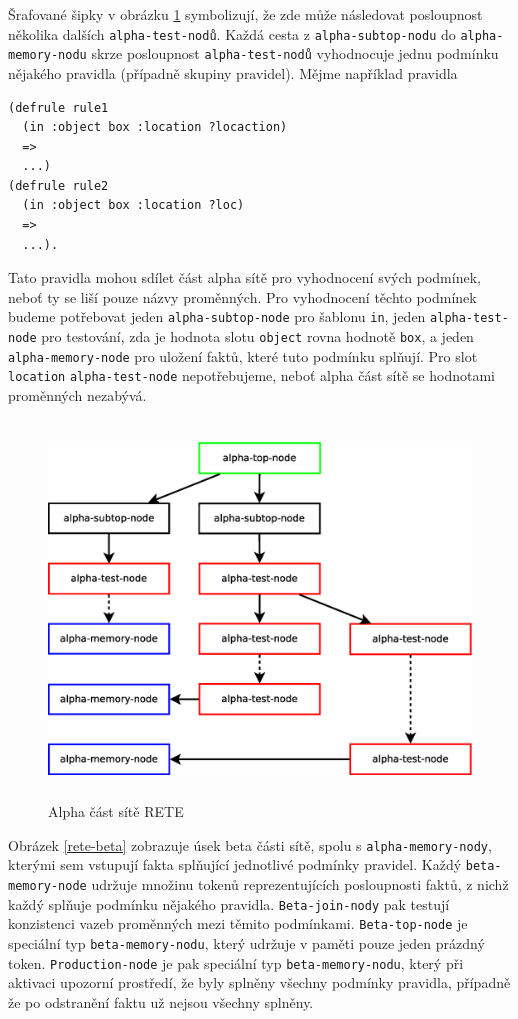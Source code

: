 Šrafované šipky v obrázku \ref{rete-alpha} symbolizují, že zde může následovat
posloupnost několika dalších \verb|alpha-test-nodů|. Každá cesta z
\verb|alpha-subtop-nodu| do \verb|alpha-memory-nodu| skrze posloupnost
\verb|alpha-test-nodů| vyhodnocuje jednu podmínku nějakého pravidla (případně
skupiny pravidel). Mějme například pravidla
\begin{verbatim}
(defrule rule1
  (in :object box :location ?locaction)
  =>
  ...)
(defrule rule2
  (in :object box :location ?loc)
  =>
  ...).
\end{verbatim}
Tato pravidla mohou sdílet část alpha sítě pro vyhodnocení svých podmínek, neboť
ty se liší pouze názvy proměnných. Pro vyhodnocení těchto podmínek budeme
potřebovat jeden \verb|alpha-subtop-node| pro šablonu \verb|in|, jeden
\verb|alpha-test-node| pro testování, zda je hodnota slotu \verb|object| rovna
hodnotě \verb|box|, a jeden \verb|alpha-memory-node| pro uložení faktů, které
tuto podmínku splňují. Pro slot \verb|location| \verb|alpha-test-node|
nepotřebujeme, neboť alpha část sítě se hodnotami proměnných nezabývá.

\begin{figure}[h]
\centering
\includegraphics[height=10cm]{rete-alpha.eps}
\caption{Alpha část sítě RETE}
\label{rete-alpha}
\end{figure}

Obrázek \ref{rete-beta} zobrazuje úsek beta části sítě, spolu s
\verb|alpha-memory-nody|, kterými sem vstupují fakta splňující jednotlivé
podmínky pravidel. Každý \verb|beta-memory-node| udržuje množinu tokenů
reprezentujících posloupnosti faktů, z nichž každý splňuje podmínku nějakého
pravidla. \verb|Beta-join-nody| pak testují konzistenci vazeb proměnných mezi
těmito podmínkami. \verb|Beta-top-node| je speciální typ
\verb|beta-memory-nodu|, který udržuje v paměti pouze jeden prázdný token.
\verb|Production-node| je pak speciální typ \verb|beta-memory-nodu|, který
při aktivaci upozorní prostředí, že byly splněny všechny podmínky pravidla,
případně že po odstranění faktu už nejsou všechny splněny.

